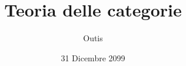 \documentclass[ paper=a4
              , pagesize
              , fontsize=12pt
              , twoside=true
              , BCOR=5mm
              , DIV=calc
              , bibliography=totoc
              , paper
              , version=last
              ]{scrbook}
\begin{document}
\frontmatter

\title{Teoria delle categorie}
\author{Outis}
\date{31 Dicembre 2099}
\publishers{Casa editrice}
\uppertitleback{Dettagli pubblicazione I?}
\lowertitleback{Dettagli pubblicazione II?}
\dedication{Alla 1,3,7-trimetilxantina ---senza cui la matematica non esisterebbe}

\maketitle

\tableofcontents

\mainmatter











\appendix



\clearpage

\backmatter
\printindex


\end{document}
